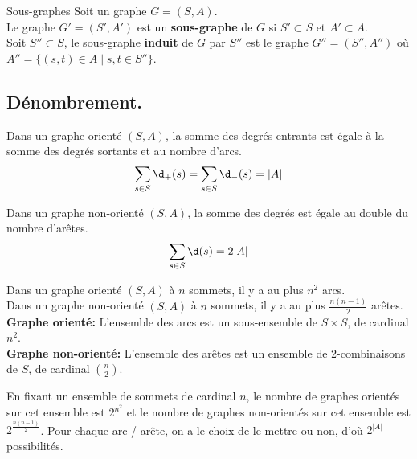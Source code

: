 \documentclass[french, 11pt]{article}
\begin{document}
\begin{defi}{Sous-graphes}{}
    Soit un graphe $G=(S,A)$.\\
    Le graphe $G'=(S',A')$ est un \textbf{sous-graphe} de $G$ si $S'\subset S$ et $A'\subset A$.\\
    Soit $S''\subset S$, le sous-graphe \textbf{induit} de $G$ par $S''$ est le graphe $G''=(S'',A'')$ où $A''=\{(s,t)\in A\mid s,t\in S''\}$.
\end{defi}

\subsection{Dénombrement.}

\begin{prop}{}{}
    Dans un graphe orienté $(S,A)$, la somme des degrés entrants est égale à la somme des degrés sortants et au nombre d'arcs.
    \begin{equation*}
        \sum_{s\in S}\d_+(s)=\sum_{s\in S}\d_-(s)=|A|
    \end{equation*}
\end{prop}

\begin{prop}{}{}
    Dans un graphe non-orienté $(S,A)$, la somme des degrés est égale au double du nombre d'arêtes.
    \begin{equation*}
        \sum_{s\in S}\d(s)=2|A|
    \end{equation*} 
\end{prop}

\begin{prop}{}{}
    Dans un graphe orienté $(S,A)$ à $n$ sommets, il y a au plus $n^2$ arcs.\\
    Dans un graphe non-orienté $(S,A)$ à $n$ sommets, il y a au plus $\frac{n(n-1)}{2}$ arêtes.
    \tcblower
    \textbf{Graphe orienté:} L'ensemble des arcs est un sous-ensemble de $S\times S$, de cardinal $n^2$.\\
    \textbf{Graphe non-orienté:} L'ensemble des arêtes est un ensemble de $2$-combinaisons de $S$, de cardinal $\binom{n}{2}$.
\end{prop}

\begin{corr}{}{}
    En fixant un ensemble de sommets de cardinal $n$, le nombre de graphes orientés sur cet ensemble est $2^{n^2}$ et le nombre de graphes non-orientés sur cet ensemble est $2^{\frac{n(n-1)}{2}}$.
    \tcblower
     Pour chaque arc / arête, on a le choix de le mettre ou non, d'où $2^{|A|}$ possibilités.
\end{corr}
\end{document}
